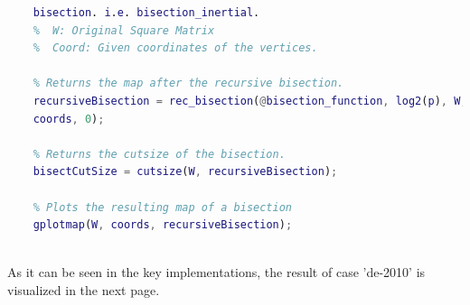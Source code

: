 \documentclass[unicode,11pt,a4paper,oneside,numbers=endperiod,openany]{scrartcl}
\begin{document}
\begin{minipage}{0.8\linewidth}

 \begin{lstlisting}[language=Matlab]
    %  @bisection_function: A pointer to function which carries out the 
    bisection. i.e. bisection_inertial.
    %  W: Original Square Matrix
    %  Coord: Given coordinates of the vertices.
    
    % Returns the map after the recursive bisection.
    recursiveBisection = rec_bisection(@bisection_function, log2(p), W,...
    coords, 0);
    
    % Returns the cutsize of the bisection.
    bisectCutSize = cutsize(W, recursiveBisection);
    
    % Plots the resulting map of a bisection
    gplotmap(W, coords, recursiveBisection);
  
 \end{lstlisting}
 \vspace{30px}

 {As it can be seen in the key implementations, the result of case 'de-2010' is visualized in the next page. } \\
  
\end{minipage}
\newpage
\end{document}
